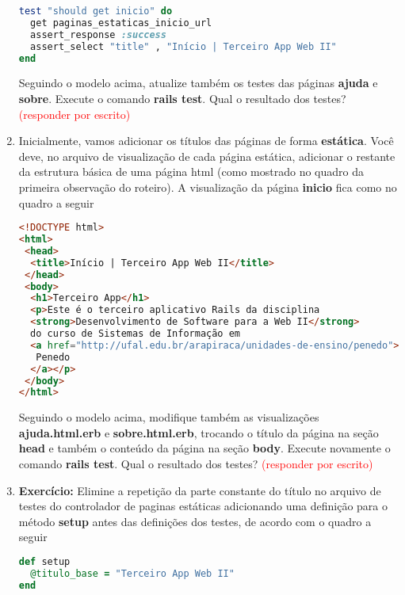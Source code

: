 \documentclass[a4paper,12pt]{article}
\begin{document}
\begin{enumerate}
  \begin{lstlisting}[language=Ruby, title={test/controllers/paginas\_estaticas\_controller\_test.rb}, basicstyle=\scriptsize]
test "should get inicio" do
  get paginas_estaticas_inicio_url
  assert_response :success
  assert_select "title" , "Início | Terceiro App Web II"
end
  \end{lstlisting}

  Seguindo o modelo acima, atualize também os testes das páginas \textbf{ajuda} e \textbf{sobre}. Execute o comando \textbf{rails test}. Qual o resultado dos testes? \textcolor{red}{(responder por escrito)}

  \item Inicialmente, vamos adicionar os títulos das páginas de forma \textbf{estática}. Você deve, no arquivo de visualização de cada página estática, adicionar o restante da estrutura básica de uma página html (como mostrado no quadro da primeira observação do roteiro). A visualização da página \textbf{inicio} fica como no quadro a seguir

  \pagebreak

  \begin{lstlisting}[language=html, title=app/views/paginas\_estaticas/inicio.html.erb, basicstyle=\scriptsize]
<!DOCTYPE html>
<html>
 <head>
  <title>Início | Terceiro App Web II</title>
 </head>
 <body>
  <h1>Terceiro App</h1>
  <p>Este é o terceiro aplicativo Rails da disciplina
  <strong>Desenvolvimento de Software para a Web II</strong>
  do curso de Sistemas de Informação em
  <a href="http://ufal.edu.br/arapiraca/unidades-de-ensino/penedo">
   Penedo
  </a></p>
 </body>
</html>
  \end{lstlisting}

  Seguindo o modelo acima, modifique também as visualizações \textbf{ajuda.html.erb} e \textbf{sobre.html.erb}, trocando o título da página na seção \textbf{head} e também o conteúdo da página na seção \textbf{body}. Execute novamente o comando \textbf{rails test}. Qual o resultado dos testes? \textcolor{red}{(responder por escrito)}

  \item \textbf{Exercício:} Elimine a repetição da parte constante do título no arquivo de testes do controlador de paginas estáticas adicionando uma definição para o método \textbf{setup} antes das definições dos testes, de acordo com o quadro a seguir

  \begin{lstlisting}[language=Ruby, title={test/controllers/paginas\_estaticas\_controller\_test.rb}, basicstyle=\scriptsize]
def setup
  @titulo_base = "Terceiro App Web II"
end


\end{lstlisting}
\end{enumerate}
\end{document}
